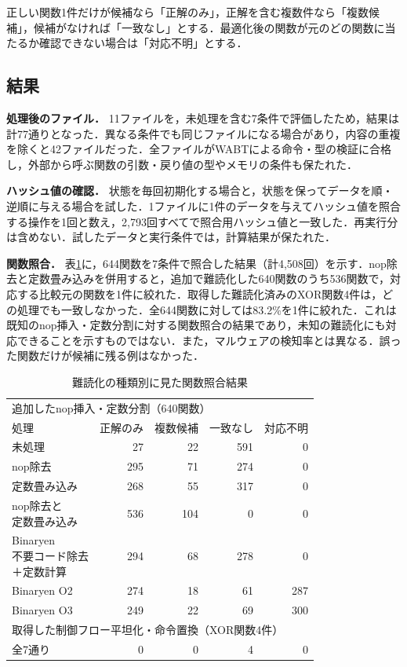 \documentclass[submit,techrep]{ipsj}
\begin{document}
正しい関数1件だけが候補なら「正解のみ」，正解を含む複数件なら「複数候補」，候補がなければ「一致なし」とする．最適化後の関数が元のどの関数に当たるか確認できない場合は「対応不明」とする．

\subsection{結果}
\noindent\textbf{処理後のファイル．}
11ファイルを，未処理を含む7条件で評価したため，結果は計77通りとなった．異なる条件でも同じファイルになる場合があり，内容の重複を除くと42ファイルだった．全ファイルがWABTによる命令・型の検証に合格し，外部から呼ぶ関数の引数・戻り値の型やメモリの条件も保たれた．

\noindent\textbf{ハッシュ値の確認．}
状態を毎回初期化する場合と，状態を保ってデータを順・逆順に与える場合を試した．1ファイルに1件のデータを与えてハッシュ値を照合する操作を1回と数え，2,793回すべてで照合用ハッシュ値と一致した．再実行分は含めない．試したデータと実行条件では，計算結果が保たれた．

\noindent\textbf{関数照合．}
表\ref{tab:followup-matching}に，644関数を7条件で照合した結果（計4,508回）を示す．nop除去と定数畳み込みを併用すると，追加で難読化した640関数のうち536関数で，対応する比較元の関数を1件に絞れた．取得した難読化済みのXOR関数4件は，どの処理でも一致しなかった．全644関数に対しては83.2\%を1件に絞れた．これは既知のnop挿入・定数分割に対する関数照合の結果であり，未知の難読化にも対応できることを示すものではない．また，マルウェアの検知率とは異なる．誤った関数だけが候補に残る例はなかった．
\begin{table}[t]
\centering\small
\caption{難読化の種類別に見た関数照合結果}
\label{tab:followup-matching}
\setlength{\tabcolsep}{3pt}
\begin{tabular}{lrrrr}
\hline
\multicolumn{5}{l}{追加したnop挿入・定数分割（640関数）} \\
処理 & 正解のみ & 複数候補 & 一致なし & 対応不明 \\
\hline
未処理 & 27 & 22 & 591 & 0 \\
nop除去 & 295 & 71 & 274 & 0 \\
定数畳み込み & 268 & 55 & 317 & 0 \\
\shortstack[l]{nop除去と\\定数畳み込み} & 536 & 104 & 0 & 0 \\
\shortstack[l]{Binaryen\\不要コード除去\\＋定数計算} & 294 & 68 & 278 & 0 \\
Binaryen O2 & 274 & 18 & 61 & 287 \\
Binaryen O3 & 249 & 22 & 69 & 300 \\
\hline
\multicolumn{5}{l}{取得した制御フロー平坦化・命令置換（XOR関数4件）} \\
全7通り & 0 & 0 & 4 & 0 \\
\hline
\end{tabular}
\end{table}
\end{document}
